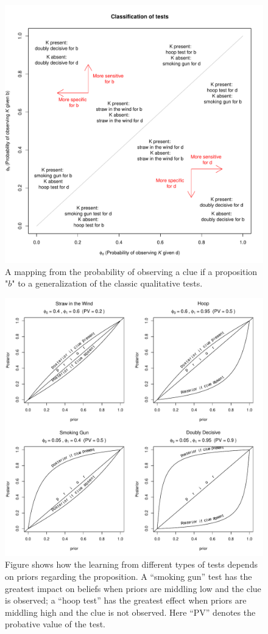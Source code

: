 \documentclass[11pt]{article}
\begin{document}
\begin{figure}[h!]
\centering
\includegraphics[width=\textwidth]{Figs/PTtests1.pdf}
\caption{{A mapping from the probability of observing a clue if a proposition "$b$"   to a generalization of the classic qualitative tests. }}
\label{CluesInferences1}
\end{figure}


\begin{figure}[h!]
\centering
\includegraphics[width=.8\textwidth]{Figs/PTtests2.pdf}
\caption{\small{Figure shows how the learning from different types of tests depends on priors regarding the proposition. A ``smoking gun'' test has the greatest impact on beliefs when priors are middling low and the clue is observed; a ``hoop test'' has the greatest effect when priors are middling high and the clue is not observed. Here ``PV'' denotes the probative value of the test.}}
\label{CluesInferences2}
\end{figure}
\end{document}
